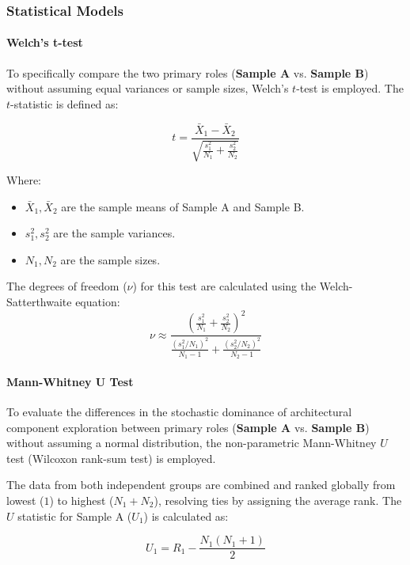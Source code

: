 \subsubsection*{Statistical Models}

\paragraph{Welch's t-test}
To specifically compare the two primary roles (\textbf{Sample A} vs. \textbf{Sample B}) without assuming equal variances or sample sizes, Welch's $t$-test is employed. The $t$-statistic is defined as:

\begin{equation}
    t = \frac{\bar{X}_1 - \bar{X}_2}{\sqrt{\frac{s_1^2}{N_1} + \frac{s_2^2}{N_2}}}
\end{equation}

Where:
\begin{itemize}
    \item $\bar{X}_1, \bar{X}_2$ are the sample means of Sample A and Sample B.
    \item $s_1^2, s_2^2$ are the sample variances.
    \item $N_1, N_2$ are the sample sizes.
\end{itemize}

The degrees of freedom ($\nu$) for this test are calculated using the Welch-Satterthwaite equation:
\begin{equation}
    \nu \approx \frac{\left(\frac{s_1^2}{N_1} + \frac{s_2^2}{N_2}\right)^2}{\frac{(s_1^2/N_1)^2}{N_1-1} + \frac{(s_2^2/N_2)^2}{N_2-1}}
\end{equation}


\paragraph{Mann-Whitney U Test}
To evaluate the differences in the stochastic dominance of architectural component exploration between primary roles (\textbf{Sample A} vs. \textbf{Sample B}) without assuming a normal distribution, the non-parametric Mann-Whitney $U$ test (Wilcoxon rank-sum test) is employed. 

The data from both independent groups are combined and ranked globally from lowest ($1$) to highest ($N_1 + N_2$), resolving ties by assigning the average rank. The $U$ statistic for Sample A ($U_1$) is calculated as:

\begin{equation}
    U_1 = R_1 - \frac{N_1(N_1 + 1)}{2}
\end{equation}

